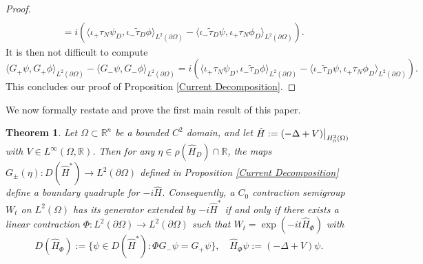 \documentclass{article}
\numberwithin{equation}{section}
\newtheorem{theoremmainagain}{Theorem}
\begin{document}
\begin{proof}
\begin{equation}
\begin{split}
    \\
    &=i\left( \langle \iota_+ \tau_N \psi_D, \iota_- \tilde{\tau}_D \phi \rangle_{L^2(\partial \Omega)} -\langle  \iota_-\tilde{\tau}_D \psi, \iota_+ \tau_N \phi_D \rangle_{L^2(\partial \Omega)}\right).
    \end{split}
\end{equation}
It is then not difficult to compute
    \begin{equation}
        \langle G_+\psi, G_+ \phi\rangle_{L^2(\partial \Omega)}- \langle G_-\psi, G_- \phi\rangle_{L^2(\partial \Omega)}= i\left( \langle \iota_+ \tau_N \psi_D, \iota_- \tilde{\tau}_D \phi \rangle_{L^2(\partial \Omega)} -\langle  \iota_-\tilde{\tau}_D \psi, \iota_+ \tau_N \phi_D \rangle_{L^2(\partial \Omega)}\right).
    \end{equation}
This concludes our proof of Proposition \ref{Current Decomposition}. \end{proof}
We now formally restate and prove the first main result of this paper.
\begin{theoremmainagain}\label{Parameterization Schrod}
    Let $\Omega \subset \mathbb{R}^n$ be a bounded $C^2$ domain, and let $\hat{H}:=(-\Delta+V)\big{|}_{H^2_0(\Omega)}$ with $V \in L^\infty(\Omega,\mathbb{R})$. Then for any $\eta\in \rho(\hat{H}_D)\cap \mathbb{R}$, the maps $G_\pm(\eta):D(\hat{H}^*)\to L^2(\partial \Omega)$ defined in Proposition \ref{Current Decomposition} define a boundary quadruple for $-i\hat{H}$. Consequently, a $C_0$ contraction semigroup $W_t$ on $L^2(\Omega)$ has its generator extended by $-i\hat{H}^*$ if and only if there exists a linear contraction $\Phi:L^2(\partial \Omega)\to L^2(\partial \Omega)$ such that $W_t=\exp(-it\hat{H}_\Phi)$ with
    \begin{equation}\label{Classification}
        D(\hat{H}_\Phi):=\{ \psi \in D(\hat{H}^*): \Phi G_- \psi= G_+ \psi\}, \quad \hat{H}_\Phi \psi:=(-\Delta+V)\psi.
    \end{equation}
\end{theoremmainagain} 
\end{document}
